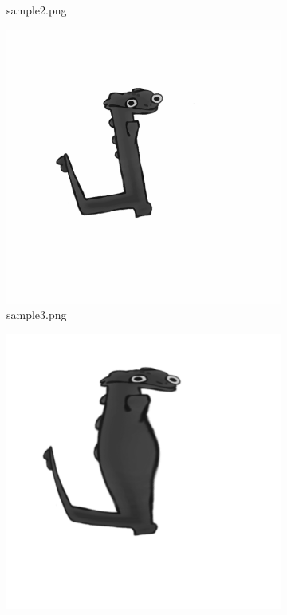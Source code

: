 \begin{figure}[H]
\begin{subfigure}[t]{.4\textwidth}
    \caption*{sample2.png}
    \end{subfigure}
    \begin{subfigure}[t]{.3\textwidth}
    \centering
    \includegraphics[width=0.9\linewidth]{images/samples/sample3.png}
    \caption*{sample3.png}
    \end{subfigure}
    \begin{subfigure}[t]{.3\textwidth}
    \centering
    \includegraphics[width=0.9\linewidth]{images/samples/sample4.png}

\end{subfigure}
\end{figure}
